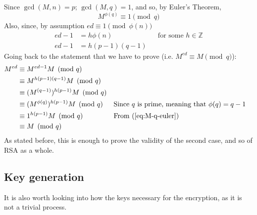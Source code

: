 \documentclass[12pt, titlepage]{article}
\begin{document}
Since $\gcd(M, n) = p$; $\gcd(M, q) = 1$, and so, by Euler's Theorem,
%
\begin{equation} \label{eq:M-q-euler} 
    M^{\phi(q)} \equiv 1 \pmod{q} 
\end{equation}
%
Also, since, by assumption $ed \equiv 1 \pmod{\phi(n)}$
%
\begin{align*}
    ed - 1 &= h\phi(n) &&\text{for some } h \in \mathbb{Z}\\
    ed - 1 &= h(p-1)(q-1)
\end{align*}
%
Going back to the statement that we have to prove (i.e. $M^{ed} \equiv M \pmod{q}$):
%
\begin{align*}
    M^{ed} &\equiv M^{ed - 1} M \pmod{q} \\
           &\equiv M^{h(p-1)(q-1)} M \pmod{q} \\
           &\equiv (M^{(q-1)})^{h(p-1)} M \pmod{q} \\
           &\equiv (M^{\phi(q)})^{h(p-1)} M \pmod{q} &&\text{Since $q$ is prime,
           meaning that $\phi(q) = q-1$} \\
           &\equiv 1^{h(p-1)} M \pmod{q} &&\text{From (\ref{eq:M-q-euler})}\\
           &\equiv M \pmod{q}
\end{align*}
%
As stated before, this is enough to prove the validity of the second case, and so of RSA as
a whole.

\subsection{Key generation}

It is also worth looking into how the keys necessary for the encryption, as it is not a
trivial process.
\end{document}
